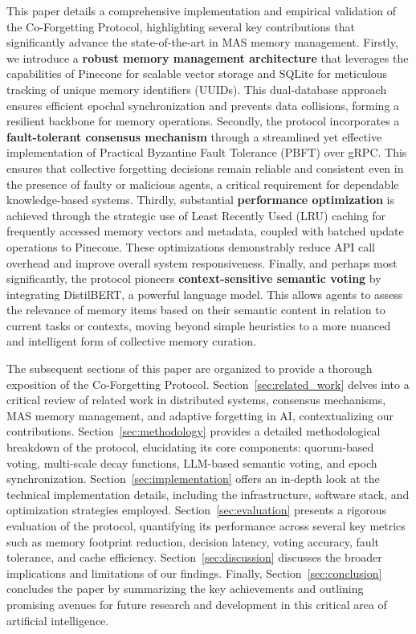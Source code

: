 \documentclass[conference]{IEEEtran}
\begin{document}
This paper details a comprehensive implementation and empirical validation of the Co-Forgetting Protocol, highlighting several key contributions that significantly advance the state-of-the-art in MAS memory management. Firstly, we introduce a \textbf{robust memory management architecture} that leverages the capabilities of Pinecone for scalable vector storage and SQLite for meticulous tracking of unique memory identifiers (UUIDs). This dual-database approach ensures efficient epochal synchronization and prevents data collisions, forming a resilient backbone for memory operations. Secondly, the protocol incorporates a \textbf{fault-tolerant consensus mechanism} through a streamlined yet effective implementation of Practical Byzantine Fault Tolerance (PBFT) \cite{Castro1999} over gRPC. This ensures that collective forgetting decisions remain reliable and consistent even in the presence of faulty or malicious agents, a critical requirement for dependable knowledge-based systems. Thirdly, substantial \textbf{performance optimization} is achieved through the strategic use of Least Recently Used (LRU) caching for frequently accessed memory vectors and metadata, coupled with batched update operations to Pinecone. These optimizations demonstrably reduce API call overhead and improve overall system responsiveness. Finally, and perhaps most significantly, the protocol pioneers \textbf{context-sensitive semantic voting} by integrating DistilBERT, a powerful language model. This allows agents to assess the relevance of memory items based on their semantic content in relation to current tasks or contexts, moving beyond simple heuristics to a more nuanced and intelligent form of collective memory curation.

The subsequent sections of this paper are organized to provide a thorough exposition of the Co-Forgetting Protocol. Section~\ref{sec:related_work} delves into a critical review of related work in distributed systems, consensus mechanisms, MAS memory management, and adaptive forgetting in AI, contextualizing our contributions. Section~\ref{sec:methodology} provides a detailed methodological breakdown of the protocol, elucidating its core components: quorum-based voting, multi-scale decay functions, LLM-based semantic voting, and epoch synchronization. Section~\ref{sec:implementation} offers an in-depth look at the technical implementation details, including the infrastructure, software stack, and optimization strategies employed. Section~\ref{sec:evaluation} presents a rigorous evaluation of the protocol, quantifying its performance across several key metrics such as memory footprint reduction, decision latency, voting accuracy, fault tolerance, and cache efficiency. Section~\ref{sec:discussion} discusses the broader implications and limitations of our findings. Finally, Section~\ref{sec:conclusion} concludes the paper by summarizing the key achievements and outlining promising avenues for future research and development in this critical area of artificial intelligence.
\end{document}

